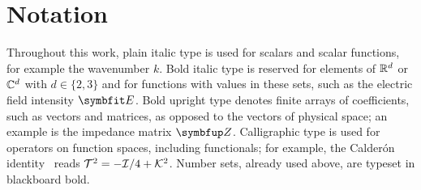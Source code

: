 \section{Notation}
\label{sec:notation}

Throughout this work, plain italic type is used for scalars and scalar functions, for example the wavenumber $k$. Bold italic type is reserved for elements of $\mathbb{R}^d$ or $\mathbb{C}^d$ with $d \in \{2, 3\}$ and for functions with values in these sets, such as the electric field intensity $\V{E}$. Bold upright type denotes finite arrays of coefficients, such as vectors and matrices, as opposed to the vectors of physical space; an example is the impedance matrix $\M{Z}$. Calligraphic type is used for operators on function spaces, including functionals; for example, the Calder\'on identity~\cite{calderon1963boundary} reads $\mathcal{T}^2 = -\mathcal{I} / 4 + \mathcal{K}^2$. Number sets, already used above, are typeset in blackboard bold.
